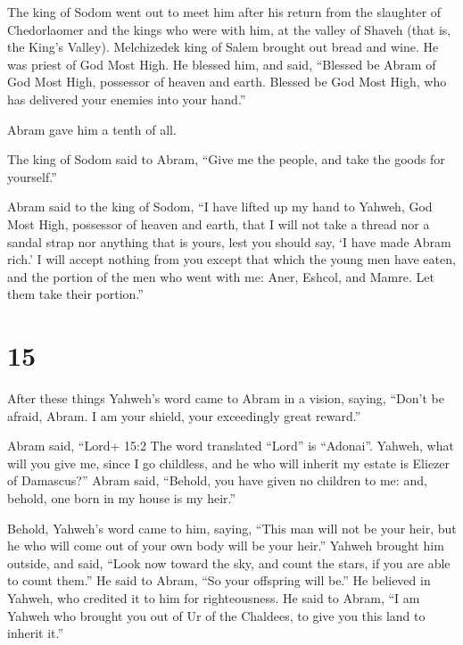  The king of Sodom went out to meet him after his return
from the slaughter of Chedorlaomer and the kings who were with him, at
the valley of Shaveh (that is, the King's Valley). 
Melchizedek king of Salem brought out bread and wine. He was priest of
God Most High.  He blessed him, and said, ``Blessed be
Abram of God Most High, possessor of heaven and earth. 
Blessed be God Most High, who has delivered your enemies into your
hand.''

Abram gave him a tenth of all.

 The king of Sodom said to Abram, ``Give me the people, and
take the goods for yourself.''

 Abram said to the king of Sodom, ``I have lifted up my
hand to Yahweh, God Most High, possessor of heaven and earth,
 that I will not take a thread nor a sandal strap nor
anything that is yours, lest you should say, `I have made Abram rich.'
 I will accept nothing from you except that which the young
men have eaten, and the portion of the men who went with me: Aner,
Eshcol, and Mamre. Let them take their portion.''

\hypertarget{section-14}{%
\section{15}\label{section-14}}

 After these things Yahweh's word came to Abram in a vision,
saying, ``Don't be afraid, Abram. I am your shield, your exceedingly
great reward.''

 Abram said, ``Lord+ 15:2 The word translated ``Lord'' is
``Adonai''. Yahweh, what will you give me, since I go childless, and he
who will inherit my estate is Eliezer of Damascus?''  Abram
said, ``Behold, you have given no children to me: and, behold, one born
in my house is my heir.''

 Behold, Yahweh's word came to him, saying, ``This man will
not be your heir, but he who will come out of your own body will be your
heir.''  Yahweh brought him outside, and said, ``Look now
toward the sky, and count the stars, if you are able to count them.'' He
said to Abram, ``So your offspring will be.''  He believed
in Yahweh, who credited it to him for righteousness.  He
said to Abram, ``I am Yahweh who brought you out of Ur of the Chaldees,
to give you this land to inherit it.''

